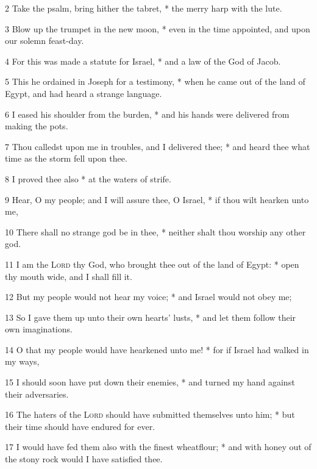 2 Take the psalm, bring hither the tabret, * the merry harp with the lute.\par
3 Blow up the trumpet in the new moon, * even in the time appointed, and upon our solemn feast-day.\par
4 For this was made a statute for Israel, * and a law of the God of Jacob.\par
5 This he ordained in Joseph for a testimony, * when he came out of the land of Egypt, and had heard a strange language.\par
6 I eased his shoulder from the burden, * and his hands were delivered from making the pots.\par
7 Thou calledst upon me in troubles, and I delivered thee; * and heard thee what time as the storm fell upon thee.\par
8 I proved thee also * at the waters of strife.\par
9 Hear, O my people; and I will assure thee, O Israel, * if thou wilt hearken unto me,\par
10 There shall no strange god be in thee, * neither shalt thou worship any other god.\par
11 I am the {\textsc{Lord}} thy God, who brought thee out of the land of Egypt: * open thy mouth wide, and I shall fill it.\par
12 But my people would not hear my voice; * and Israel would not obey me;\par
13 So I gave them up unto their own hearts' lusts, * and let them follow their own imaginations.\par
14 O that my people would have hearkened unto me! * for if Israel had walked in my ways,\par
15 I should soon have put down their enemies, * and turned my hand against their adversaries.\par
16 The haters of the {\textsc{Lord}} should have submitted themselves unto him; * but their time should have endured for ever.\par
17 I would have fed them also with the finest wheatflour; * and with honey out of the stony rock would I have satisfied thee.
